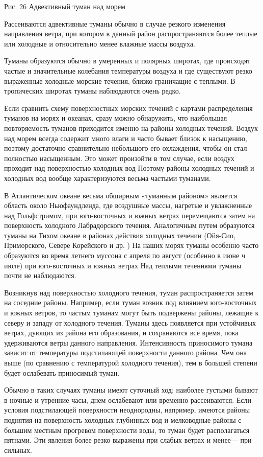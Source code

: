 Рис. 26 Адвективный туман над морем

Рассеиваются адвективные туманы обычно в случае резкого изменения направления ветра, при котором в данный район распространяются более теплые или холодные и относительно менее влажные массы воздуха.

Туманы образуются обычно в умеренных и полярных широтах, где происходят частые и значительные колебания температуры воздуха и где существуют резко выраженные холодные морские течения, близко граничащие с теплыми. В тропических широтах туманы наблюдаются очень редко.

Если сравнить схему поверхностных морских течений с картами распределения туманов на морях и океанах, сразу можно обнаружить, что наибольшая повторяемость туманов приходится именно на районы холодных течений. Воздух над морем всегда содержит много влаги и часто бывает близок к насыщению, поэтому достаточно сравнительно небольшого его охлаждения, чтобы он стал полностью насыщенным. Это может произойти в том случае, если воздух проходит над поверхностью холодных вод Поэтому районы холодных течений и холодных вод вообще характеризуются весьма частыми туманами.

В Атлантическом океане весьма обширным «туманным районом» является область около Ньюфаундленда, где воздушные массы, нагретые и увлажненные над Гольфстримом, при юго-восточных и южных ветрах перемещаются затем на поверхность холодного Лабрадорского течения. Аналогичным путем образуются туманы на Тихом океане в районах действия холодных течении (Ойя-Сио, Приморского, Севере Корейского и др. ) На наших морях туманы особенно часто образуются во время летнего муссона с апреля по август (особенно в июне ч июле) при юго-восточных и южных ветрах Над теплыми течениями туманы почти не наблюдаются.

Возникнув над поверхностью холодного течения, туман распространяется затем на соседние районы. Например, если туман возник под влиянием юго-восточных и южных ветров, то частым туманам могут быть подвержены районы, лежащие к северу и западу от холодного течения. Туманы здесь появляется при устойчивых ветрах, дующих из района его образования, и сохраняются все время, пока удерживаются ветры данного направления. Интенсивность приносимого тумана зависит от температуры подстилающей поверхности данного района. Чем она выше (по сравнению с температурой холодного течения), тем в большей степени будет ослабевать приносимый туман.

Обычно в таких случаях туманы имеют суточный ход: наиболее густыми бывают в ночные и утренние часы, днем ослабевают или временно рассеиваются. Если условия подстилающей поверхности неоднородны, например, имеются районы поднятия на поверхность холодных глубинных вод и мелководные районы с большим местным прогревом поверхности воды, то туман будет располагаться пятнами. Эти явления более резко выражены при слабых ветрах и менее— при сильных.

